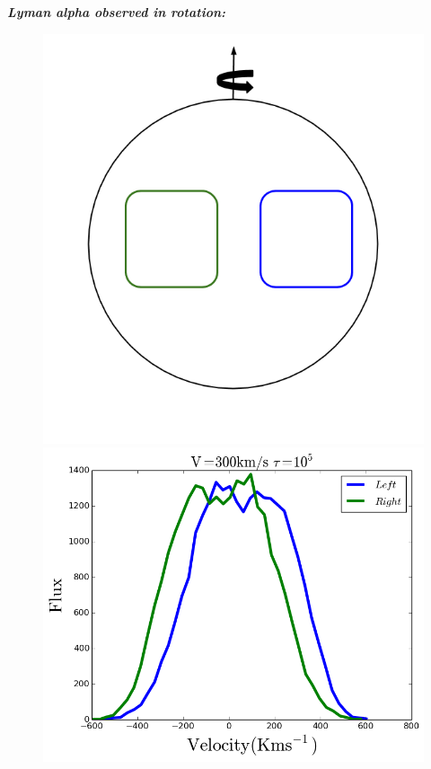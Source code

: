 \documentclass{beamer}
\begin{document}
\begin{frame}{\textit{\textbf{Lyman alpha observed in rotation:}}}
\begin{figure}
\includegraphics[scale=0.2]{Figures/measure.png}
\includegraphics[scale=0.4]{Figures/obs.png}
\end{figure}
\end{frame}
\end{document}

